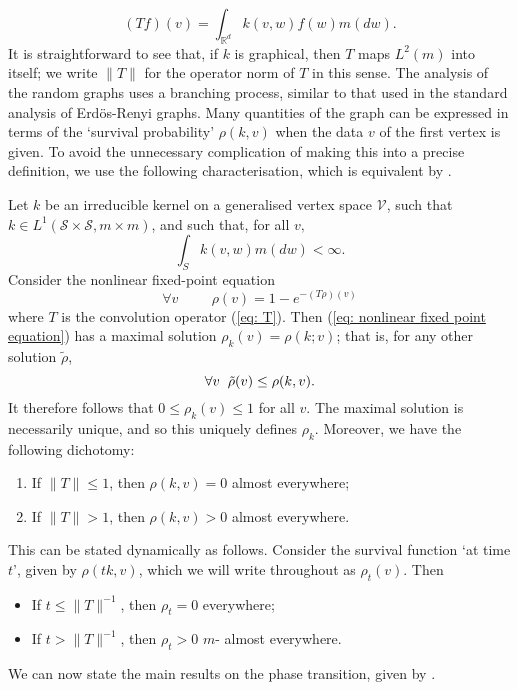 \begin{equation}\label{eq: T}
       (T f)(v)=\int_{\mathbb{R}^d} k(v,w)f(w)m(dw). 
   \end{equation}  It is straightforward to see that, if $k$ is graphical, then $T$ maps $L^2(m)$ into itself; we write $\|T\|$ for the operator norm of $T$ in this sense.  The analysis of the random graphs uses a branching process, similar to that used in the standard analysis of Erd\"os-Renyi graphs. Many quantities of the graph can be expressed in terms of the `survival probability' $\rho(k, v)$ when the data $v$ of the first vertex is given. To avoid the unnecessary complication of making this into a precise definition, we use the following characterisation, which is equivalent by \cite[Theorem 6.2]{BJR07}.
   \begin{lemma}\label{lemma: survival function}
       Let $k$ be an irreducible kernel on a generalised vertex space $\mathcal{V}$, such that $k \in L^1(\mathcal{S}\times \mathcal{S}, m \times m)$, and such that, for all $v,$ \begin{equation} \label{eq: BJR 51}
           \int_S k(v,w)m(dw)<\infty.
       \end{equation} Consider the nonlinear fixed-point equation 
      \begin{equation} \label{eq: nonlinear fixed point equation} 
        \forall v\hspace{1cm}  {\rho}(v)=1-e^{-(T{\rho})(v)}
      \end{equation} where $T$ is the convolution operator (\ref{eq: T}). Then (\ref{eq: nonlinear fixed point equation}) has a maximal solution $\rho_k(v)=\rho(k;v)$; that is, for any other solution $\tilde{\rho}$, \begin{equation}
          \forall v \hspace{0.2cm} \tilde{\rho}(v)\leq \rho(k,v).
      \end{equation} It therefore follows that $0\leq \rho_k(v)\leq 1$ for all $v$. The maximal solution is necessarily unique, and so this uniquely defines $\rho_k.$ Moreover, we have the following dichotomy:
      \begin{enumerate}[label=\roman{*}).]
          \item If $\|T\|\leq 1$, then $\rho(k, v)=0$ almost everywhere;
          \item If $\|T\|> 1$, then $\rho(k, v)>0$ almost everywhere.
      \end{enumerate} This can be stated dynamically as follows. Consider the survival function `at time $t$', given by $\rho(tk,v)$, which we will write throughout as $\rho_t(v)$. Then 
      \begin{itemize}
          \item If $t\leq \|T\|^{-1}$, then $\rho_t=0$ everywhere;
          \item If $t>\|T\|^{-1}$, then $\rho_t>0$ $m$- almost everywhere.
      \end{itemize}
      
   \end{lemma} We can now state the main results on the phase transition, given by \cite[Theorem 3.1 and Corollary 3.2]{BJR07}.
